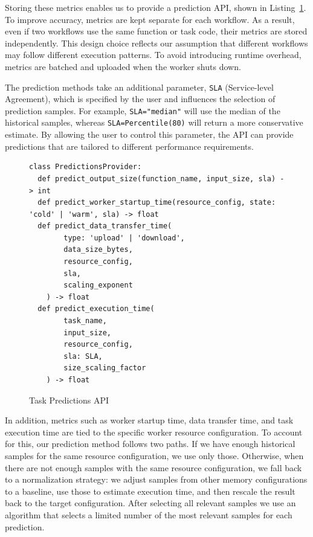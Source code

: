 \documentclass[conference]{IEEEtran}
\begin{document}
Storing these metrics enables us to provide a prediction API, shown in Listing~\ref{lst:task_predictions_api}. To improve accuracy, metrics are kept separate for each workflow. As a result, even if two workflows use the same function or task code, their metrics are stored independently. This design choice reflects our assumption that different workflows may follow different execution patterns. To avoid introducing runtime overhead, metrics are batched and uploaded when the worker shuts down.

The prediction methods take an additional parameter, \texttt{SLA} (Service-level Agreement), which is specified by the user and influences the selection of prediction samples. For example, \texttt{SLA="median"} will use the median of the historical samples, whereas \texttt{SLA=Percentile(80)} will return a more conservative estimate. By allowing the user to control this parameter, the API can provide predictions that are tailored to different performance requirements.

\begin{figure}[h]
\centering
\begin{lstlisting}[basicstyle=\ttfamily\footnotesize, columns=fullflexible, breaklines=true]
class PredictionsProvider:
  def predict_output_size(function_name, input_size, sla) -> int
  def predict_worker_startup_time(resource_config, state: 'cold' | 'warm', sla) -> float
  def predict_data_transfer_time(
        type: 'upload' | 'download',
        data_size_bytes,
        resource_config,
        sla,
        scaling_exponent
    ) -> float
  def predict_execution_time(
        task_name,
        input_size,
        resource_config,
        sla: SLA,
        size_scaling_factor
    ) -> float
\end{lstlisting}
\caption{Task Predictions API}
\label{lst:task_predictions_api}
\end{figure}

In addition, metrics such as worker startup time, data transfer time, and task execution time are tied to the specific worker resource configuration. To account for this, our prediction method follows two paths. If we have enough historical samples for the same resource configuration, we use only those. Otherwise, when there are not enough samples with the same resource configuration, we fall back to a normalization strategy: we adjust samples from other memory configurations to a baseline, use those to estimate execution time, and then rescale the result back to the target configuration. After selecting all relevant samples we use an algorithm that selects a limited number of the most relevant samples for each prediction.
\end{document}
